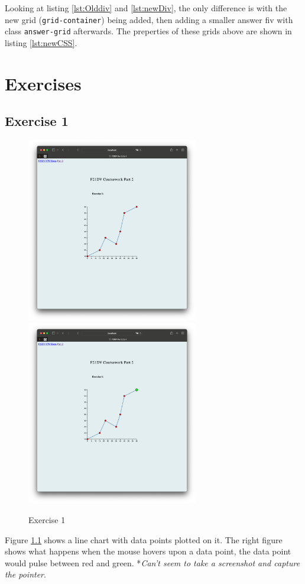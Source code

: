 \documentclass{scrreprt}
\begin{document}
Looking at listing \ref{lst:Olddiv} and \ref{lst:newDiv}, the only difference is with the new grid (\verb|grid-container|) being added, then adding a smaller answer fiv with class \verb|answer-grid| afterwards. The preperties of these grids above are shown in listing \ref{lst:newCSS}.

\newpage
\chapter{Exercises}
\section{Exercise 1}
\begin{figure}[!ht]
    \centering
    \includegraphics[width = 7.5cm]{images/ex1_1.png}
    \includegraphics[width = 7.5cm]{images/ex1_2.png}
    \label{fig:ex1}
    \caption{Exercise 1}
\end{figure}
\FloatBarrier
Figure \ref{fig:ex1} shows a line chart with data points plotted on it. The right figure shows what happens when the mouse hovers upon a data point, the data point would pulse between red and green. *\textit{Can't seem to take a screenshot and capture the pointer}.
\end{document}

